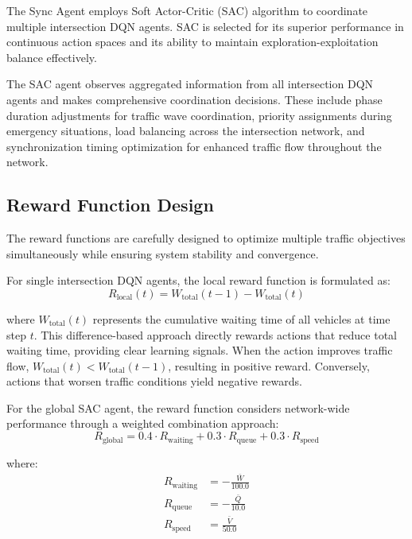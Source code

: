 The Sync Agent employs Soft Actor-Critic (SAC) algorithm to coordinate multiple intersection DQN agents. SAC is selected for its superior performance in continuous action spaces and its ability to maintain exploration-exploitation balance effectively.

The SAC agent observes aggregated information from all intersection DQN agents and makes comprehensive coordination decisions. These include phase duration adjustments for traffic wave coordination, priority assignments during emergency situations, load balancing across the intersection network, and synchronization timing optimization for enhanced traffic flow throughout the network.

\subsection{Reward Function Design}\label{subsec2a-4}

The reward functions are carefully designed to optimize multiple traffic objectives simultaneously while ensuring system stability and convergence.

For single intersection DQN agents, the local reward function is formulated as:
\begin{equation}
R_{\text{local}}(t) = W_{\text{total}}(t-1) - W_{\text{total}}(t)
\end{equation}

where $W_{\text{total}}(t)$ represents the cumulative waiting time of all vehicles at time step $t$. This difference-based approach directly rewards actions that reduce total waiting time, providing clear learning signals. When the action improves traffic flow, $W_{\text{total}}(t) < W_{\text{total}}(t-1)$, resulting in positive reward. Conversely, actions that worsen traffic conditions yield negative rewards.

For the global SAC agent, the reward function considers network-wide performance through a weighted combination approach:
\begin{equation}
R_{\text{global}} = 0.4 \cdot R_{\text{waiting}} + 0.3 \cdot R_{\text{queue}} + 0.3 \cdot R_{\text{speed}}
\end{equation}

where:
\begin{align}
R_{\text{waiting}} &= -\frac{\bar{W}}{100.0} \\
R_{\text{queue}} &= -\frac{\bar{Q}}{10.0} \\
R_{\text{speed}} &= \frac{\bar{V}}{50.0}
\end{align}

